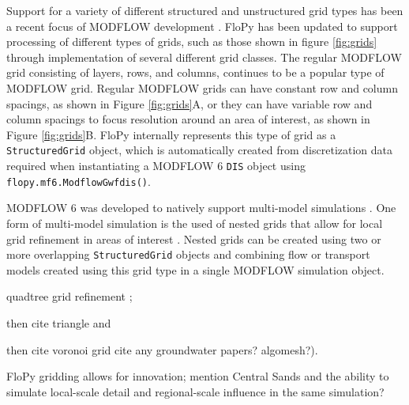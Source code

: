 \documentclass[11pt, oneside]{article}   	%
\begin{document}
Support for a variety of different structured and unstructured grid types has been a recent focus of MODFLOW development \citep{modflowusg, modflow6gwf, modflow6xt3d}.  FloPy has been updated to support processing of different types of grids, such as those shown in figure \ref{fig:grids} through implementation of several different grid classes.  The regular MODFLOW grid consisting of layers, rows, and columns, continues to be a popular type of MODFLOW grid.  Regular MODFLOW grids can have constant row and column spacings, as shown in Figure \ref{fig:grids}A, or they can have variable row and column spacings to focus resolution around an area of interest, as shown in Figure \ref{fig:grids}B.  FloPy internally represents this type of grid as a \texttt{StructuredGrid} object, which is automatically created from discretization data required when instantiating a MODFLOW 6 \texttt{DIS} object using \texttt{flopy.mf6.ModflowGwfdis()}.  

MODFLOW 6 was developed to natively support multi-model simulations \citep{modflow6framework}. One form of multi-model simulation is the used of nested grids that allow for local grid refinement in areas of interest \citep{modflowlgr, vilhelmsen2012evaluation, modflowlgr2}. Nested grids can be created using two or more overlapping \texttt{StructuredGrid} objects and combining flow or transport models created using this grid type in a single MODFLOW simulation object.

quadtree grid refinement \citep{gridgen}; 

then cite triangle \citep{trianglemesh} and 

then cite voronoi grid \citep{2020SciPy-NMeth} cite any groundwater papers? algomesh?).

FloPy gridding allows for innovation; mention Central Sands and the ability to simulate local-scale detail and regional-scale influence in the same simulation?
\end{document}
